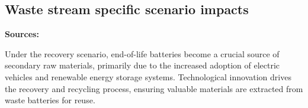 \subsectionEndline
\clearpage

\subsection{Waste stream specific scenario impacts}



\wasteSubsubsecBATT
\textbf{Sources:}~\cite{helander2023battelv, eu2020batt, halleux2021batt, eu2023batt}

Under the recovery scenario, end-of-life batteries become a crucial source of secondary raw materials, primarily due to the increased adoption of electric vehicles and renewable energy storage systems. Technological innovation drives the recovery and recycling process, ensuring valuable materials are extracted from waste batteries for reuse.

